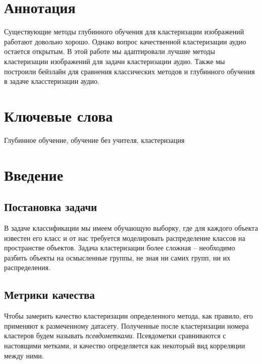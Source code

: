 \documentclass[a4paper,12pt]{extarticle}
\begin{document}
\newpage
\setcounter{page}{2}

{
	\hypersetup{linkcolor=black}
	\tableofcontents
}

\newpage

\newpage
\section*{Аннотация}   %
    Существующие методы глубинного обучения для кластеризации 
    изображений работают довольно хорошо. Однако вопрос качественной
    кластеризации аудио остается открытым. В этой работе мы
    адаптировали лучшие методы кластеризации изображений для 
    задачи кластеризации аудио. Также мы построили бейзлайн для 
    сравнения классических методов и глубинного обучения в задаче 
    класстеризации аудио.


\section*{Ключевые слова}
Глубинное обучение, обучение без учителя, кластеризация
\pagebreak

\section{Введение}

\subsection{Постановка задачи}

В задаче классификации мы имеем обучающую выборку, где для каждого объекта
известен его класс и от нас требуется моделировать распределение
классов на пространстве объектов. Задача кластеризации более сложная
-- необходимо разбить объекты на осмысленные группы, не зная ни 
самих групп, ни их распределения.

\subsection{Метрики качества}

Чтобы замерить качество кластеризации определенного метода, как правило, 
его применяют к размеченному датасету. Полученные после 
кластеризации номера кластеров будем называть \textit{псевдометками}.
Псевдометки сравниваются с настоящими метками,
и качество определяется как некоторый вид корреляции между ними.
\end{document}
